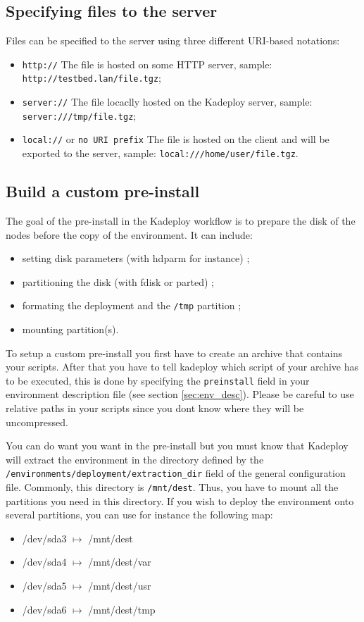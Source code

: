 \documentclass[a4wide,10pt,oneside]{book}
\newcommand{\ypath}[1]{\texttt{#1}}
\begin{document}
\subsection{Specifying files to the server\label{sec:api_files_export}}
Files can be specified to the server using three different URI-based notations:
\begin{itemize}
  \item \texttt{http://} The file is hosted on some HTTP server, sample: \texttt{http://testbed.lan/file.tgz};
  \item \texttt{server://} The file locaclly hosted on the Kadeploy server, sample: \texttt{server:///tmp/file.tgz};
  \item \texttt{local://} or \texttt{no URI prefix} The file is hosted on the client and will be exported to the server, sample: \texttt{local:///home/user/file.tgz}.
\end{itemize}

\subsection{Build a custom pre-install}\label{sec:custom-preinstall}
The goal of the pre-install in the Kadeploy workflow is to prepare the disk of the nodes before the copy of the environment. It can include:
\begin{itemize}
\item setting disk parameters (with hdparm for instance) ;
\item partitioning the disk (with fdisk or parted) ;
\item formating the deployment and the \texttt{/tmp} partition ;
\item mounting partition(s).
\end{itemize}

To setup a custom pre-install you first have to create an archive that contains your scripts. After that you have to tell kadeploy which script of your archive has to be executed, this is done by specifying the \texttt{preinstall} field in your environment description file (see section \ref{sec:env_desc}). Please be careful to use relative paths in your scripts since you dont know where they will be uncompressed.

You can do want you want in the pre-install but you must know that Kadeploy will extract the environment in the directory defined by the \ypath{/environments/deployment/extraction\_dir} field of the general configuration file. Commonly, this directory is \texttt{/mnt/dest}. Thus, you have to mount all the partitions you need in this directory. If you wish to deploy the environment onto several partitions, you can use for instance the following map:
\begin{itemize}
\item /dev/sda3 $\mapsto$ /mnt/dest
\item /dev/sda4 $\mapsto$ /mnt/dest/var
\item /dev/sda5 $\mapsto$ /mnt/dest/usr
\item /dev/sda6 $\mapsto$ /mnt/dest/tmp
\end{itemize}
\end{document}
